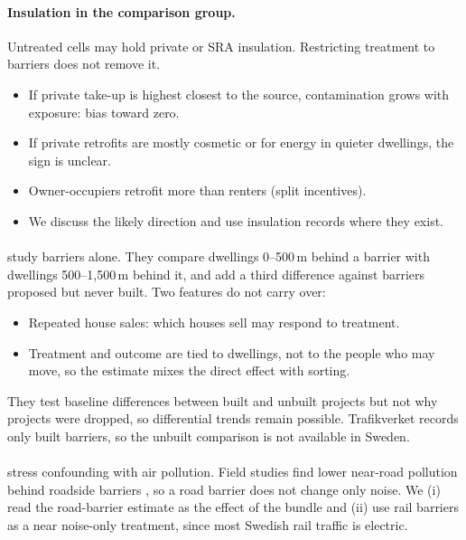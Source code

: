 \documentclass[11pt]{article}
\begin{document}
\paragraph{Insulation in the comparison group.} Untreated cells may hold private or SRA
insulation. Restricting treatment to barriers does not remove it.
\begin{itemize}
\item If private take-up is highest closest to the source, contamination grows with exposure:
  bias toward zero.
\item If private retrofits are mostly cosmetic or for energy in quieter dwellings, the sign is
  unclear.
\item Owner-occupiers retrofit more than renters (split incentives).
\item We discuss the likely direction and use insulation records where they exist.
\end{itemize}

\paragraph{\textcite{morettiTrafficNoiseExternality2025}} study barriers alone. They compare
dwellings 0--500\,m behind a barrier with dwellings 500--1,500\,m behind it, and add a third
difference against barriers proposed but never built. Two features do not carry over:
\begin{itemize}
\item Repeated house sales: which houses sell may respond to treatment.
\item Treatment and outcome are tied to dwellings, not to the people who may move, so the
  estimate mixes the direct effect with sorting.
\end{itemize}
They test baseline differences between built and unbuilt projects but not why projects were
dropped, so differential trends remain possible. Trafikverket records only built barriers, so
the unbuilt comparison is not available in Sweden.

\paragraph{\textcite{greenhillNoisePollutionInfant2026}} stress confounding with air pollution.
Field studies find lower near-road pollution behind roadside barriers
\autocite{baldaufImpactsNoiseBarriers2008}, so a road barrier does not change only noise. We
(i) read the road-barrier estimate as the effect of the bundle and (ii) use rail barriers as a
near noise-only treatment, since most Swedish rail traffic is electric.
\end{document}
